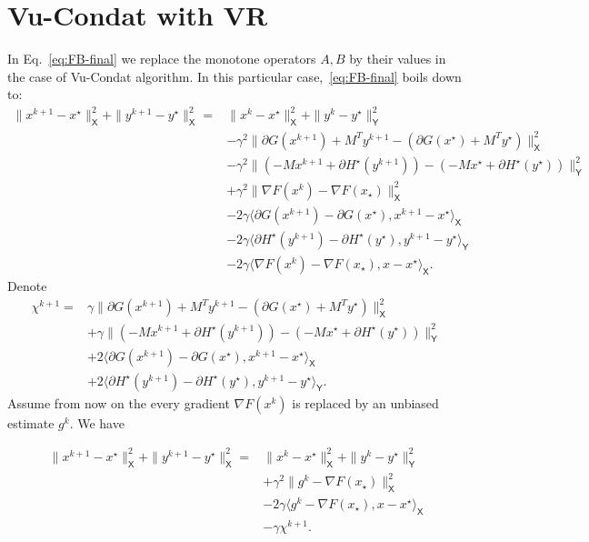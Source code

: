 \documentclass{article}
\newcommand{\sX}{{\mathsf X}}
\newcommand{\sY}{{\mathsf Y}}
\newcommand{\ps}[1]{\langle #1 \rangle}
\theoremstyle{definition}
\begin{document}
    \section{Vu-Condat with VR}
    In Eq.~\eqref{eq:FB-final} we replace the monotone operators $A,B$ by their values in the case of Vu-Condat algorithm.  In this particular case,~\eqref{eq:FB-final} boils down to:
\begin{align*}
    \|x^{k+1} - x^\star\|_\sX^2 + \|y^{k+1} - y^\star\|_\sX^2 
    =& \|x^k - x^\star\|_\sX^2 + \|y^k - y^\star\|_\sY^2 \\
    &-\gamma^2\|\partial G(x^{k+1}) + M^T y^{k+1} - (\partial G(x^{\star}) + M^T y^{\star})\|_\sX^2 \\
    &- \gamma^2\|(-M x^{k+1} + \partial H^\star(y^{k+1})) - (-M x^{\star} + \partial H^\star(y^{\star}))\|_\sY^2 \\
    &+ \gamma^2 \|\nabla F(x^k) - \nabla F(x_\star) \|_\sX^2\\
    &- 2\gamma\ps{\partial G(x^{k+1})-\partial G(x^\star),x^{k+1}-x^\star}_\sX \\
    &- 2\gamma\ps{\partial H^\star(y^{k+1})-\partial H^\star(y^\star),y^{k+1}-y^\star}_\sY \\
    &- 2\gamma\ps{\nabla F(x^k) - \nabla F(x_\star),x-x^\star}_\sX.
\end{align*}
Denote 
\begin{align*}
    \chi^{k+1} 
    =& \gamma\|\partial G(x^{k+1}) + M^T y^{k+1} - (\partial G(x^{\star}) + M^T y^{\star})\|_\sX^2 \\
    & +\gamma\|(-M x^{k+1} + \partial H^\star(y^{k+1})) - (-M x^{\star} + \partial H^\star(y^{\star}))\|_\sY^2 \\
    &+ 2\ps{\partial G(x^{k+1})-\partial G(x^\star),x^{k+1}-x^\star}_\sX \\
    &+ 2\ps{\partial H^\star(y^{k+1})-\partial H^\star(y^\star),y^{k+1}-y^\star}_\sY.
\end{align*}
Assume from now on the every gradient $\nabla F(x^k)$ is replaced by an unbiased estimate $g^k$. We have


\begin{align*}
    \|x^{k+1} - x^\star\|_\sX^2 + \|y^{k+1} - y^\star\|_\sX^2 
    =& \|x^k - x^\star\|_\sX^2 + \|y^k - y^\star\|_\sY^2 \\
    &+ \gamma^2 \|g^k - \nabla F(x_\star) \|_\sX^2\\
    &- 2\gamma\ps{g^k - \nabla F(x_\star),x-x^\star}_\sX\\
    &-\gamma \chi^{k+1}.
\end{align*}
\end{document}
